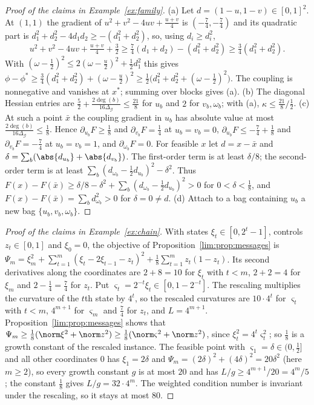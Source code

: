 \begin{proof}[Proof of the claims in Example~\ref{ex:family}]
(a) Let $d=(1-u,1-v)\in[0,1]^2$. At $(1,1)$ the gradient of
$u^2+v^2-4uv+\frac{u+v}4$ is $(-\frac74,-\frac74)$ and its quadratic part is
$d_1^2+d_2^2-4d_1d_2\ge-(d_1^2+d_2^2)$, so, using $d_i\ge d_i^2$,
\[
u^2+v^2-4uv+\tfrac{u+v}4+\tfrac32\ge\tfrac74(d_1+d_2)-(d_1^2+d_2^2)
\ge\tfrac34(d_1^2+d_2^2).
\]
With $(\omega-\frac12)^2\le2(\omega-\frac u2)^2+\frac12d_1^2$ this gives
$\phi-\phi^*\ge\frac34(d_1^2+d_2^2)+(\omega-\frac u2)^2\ge\frac12\bigl(d_1^2+d_2^2
+(\omega-\frac12)^2\bigr)$. The coupling is nonnegative and vanishes at $x^*$;
summing over blocks gives (a). (b) The diagonal Hessian entries are
$\frac52+\frac{2\deg(b)}{16\Delta_{\mathcal G}}\le\frac{21}8$ for $u_b$ and
$2$ for $v_b,\omega_b$; with (a), $\kappa\le\frac{21}8/\frac12$.
(c) At such a point $\bar x$ the coupling gradient in $u_b$ has absolute
value at most $\frac{2\deg(b)}{16\Delta_{\mathcal G}}\le\frac18$. Hence
$\partial_{u_b}F\ge\frac18$ and $\partial_{v_b}F=\frac14$ at $u_b=v_b=0$,
$\partial_{u_b}F\le-\frac74+\frac18$ and $\partial_{v_b}F=-\frac74$ at
$u_b=v_b=1$, and $\partial_{\omega_b}F=0$. For feasible $x$ let $d=x-\bar x$
and $\delta=\sum_b(\abs{d_{u_b}}+\abs{d_{v_b}})$. The first-order term is at
least $\delta/8$; the second-order term is at least
$\sum_b(d_{\omega_b}-\frac12d_{u_b})^2-\delta^2$. Thus
$F(x)-F(\bar x)\ge\delta/8-\delta^2+\sum_b(d_{\omega_b}-\frac12d_{u_b})^2>0$ for
$0<\delta<\frac18$, and $F(x)-F(\bar x)=\sum_bd_{\omega_b}^2>0$ for $\delta=0\ne d$.
(d) Attach to a bag containing $u_b$ a new bag $\{u_b,v_b,\omega_b\}$.
\end{proof}

\begin{proof}[Proof of the claims in Example~\ref{ex:chain}]
With states $\xi_t\in[0,2^t-1]$, controls $z_t\in[0,1]$ and $\xi_0=0$, the
objective of Proposition~\ref{lim:prop:messages} is
$\Psi_m=\xi_m^2+\sum_{t=1}^m(\xi_t-2\xi_{t-1}-z_t)^2
+\frac18\sum_{t=1}^mz_t(1-z_t)$.
Its second derivatives along the coordinates are $2+8=10$ for $\xi_t$ with
$t<m$, $2+2=4$ for $\xi_m$ and $2-\frac14=\frac74$ for $z_t$. Put
$\varsigma_t=2^{-t}\xi_t\in[0,1-2^{-t}]$. The rescaling multiplies the
curvature of the $t$th state by $4^t$, so the rescaled curvatures are
$10\cdot4^t$ for $\varsigma_t$ with $t<m$, $4^{m+1}$ for $\varsigma_m$ and
$\frac74$ for $z_t$,
and $L=4^{m+1}$. Proposition~\ref{lim:prop:messages} shows that
$\Psi_m\ge\frac18(\norm\xi^2+\norm z^2)\ge\frac18(\norm\varsigma^2+\norm z^2)$,
since $\xi_t^2=4^t\varsigma_t^2$; so $\frac18$ is a growth constant of the
rescaled instance. The feasible point with $\varsigma_1=\delta\in(0,\frac12]$
and all other coordinates $0$ has $\xi_1=2\delta$ and
$\Psi_m=(2\delta)^2+(4\delta)^2=20\delta^2$ (here $m\ge2$), so every growth constant
$g$ is at most $20$ and has $L/g\ge4^{m+1}/20=4^m/5$; the constant $\frac18$
gives $L/g=32\cdot4^m$. The weighted condition number is invariant under the
rescaling, so it stays at most $80$.
\end{proof}
